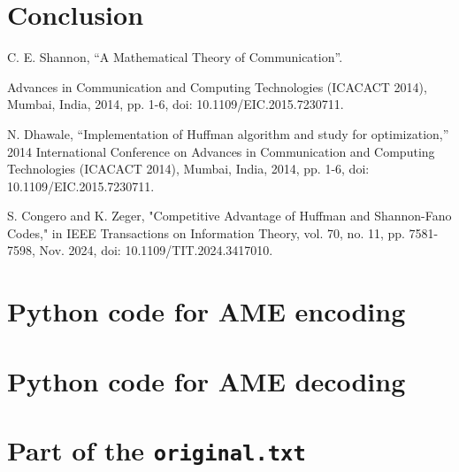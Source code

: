 \documentclass[12pt,twoside]{article}
\begin{document}
\section{Conclusion}


\begin{thebibliography}{9}
     C. E. Shannon, “A Mathematical Theory of Communication”.

     Advances in Communication and Computing Technologies (ICACACT 2014), Mumbai, India, 2014, pp. 1-6, doi: 10.1109/EIC.2015.7230711.

     N. Dhawale, ``Implementation of Huffman algorithm and study for optimization,'' 2014 International Conference on Advances in Communication and Computing Technologies (ICACACT 2014), Mumbai, India, 2014, pp. 1-6, doi: 10.1109/EIC.2015.7230711.

     S. Congero and K. Zeger, "Competitive Advantage of Huffman and Shannon-Fano Codes," in IEEE Transactions on Information Theory, vol. 70, no. 11, pp. 7581-7598, Nov. 2024, doi: 10.1109/TIT.2024.3417010. 

\end{thebibliography}

\newpage
\appendix

\begin{appendices}

\section{Python code for AME encoding}
\label{app:markov_encode}


\section{Python code for AME decoding}
\label{app:markov_decode}


\section{Part of the \texttt{original.txt}}
\label{lst:originalpart}




\end{appendices}
\end{document}
